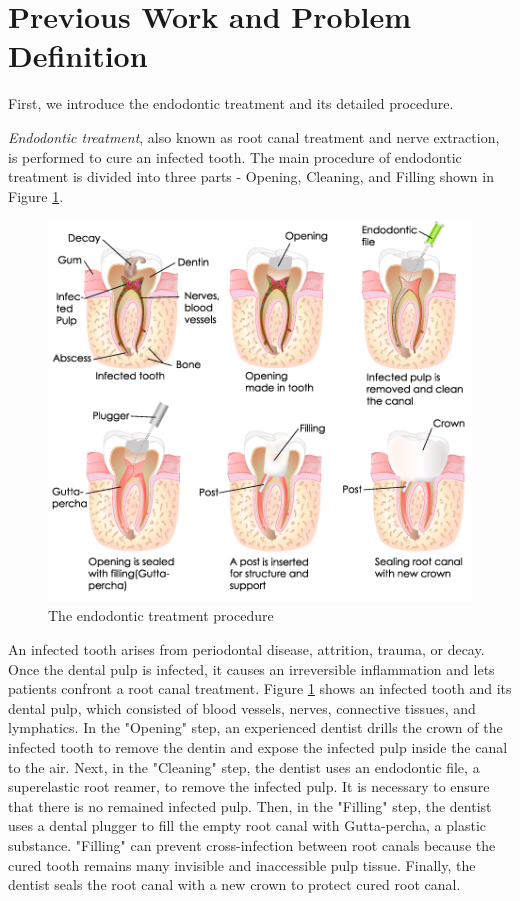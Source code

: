\section{Previous Work and Problem Definition}
\hspace*{6mm}First, we introduce the endodontic treatment and its detailed procedure.
\par
\textit{Endodontic treatment}, also known as root canal treatment and nerve extraction, is performed to cure an infected tooth. The main procedure of endodontic treatment is divided into three parts - Opening, Cleaning, and Filling shown in  Figure \ref{fig:endo-procedure}.
\begin{figure}[htbp]
\begin{center}
\includegraphics[width=0.75\linewidth]{Images/endo-procedure.png}
\caption[The endodontic treatment procedure]{The endodontic treatment procedure \cite{web7}}
\label{fig:endo-procedure}
\end{center}
\end{figure}
\par
An infected tooth arises from periodontal disease, attrition, trauma, or decay. Once the dental pulp is infected, it causes an irreversible inflammation and lets patients confront a root canal treatment. Figure \ref{fig:endo-procedure} shows an infected tooth and its dental pulp, which consisted of blood vessels, nerves, connective tissues, and lymphatics. In the "Opening" step, an experienced dentist drills the crown of the infected tooth to remove the dentin and expose the infected pulp inside the canal to the air. Next, in the "Cleaning" step, the dentist uses an endodontic file, a superelastic root reamer, to remove the infected pulp. It is necessary to ensure that there is no remained infected pulp. Then, in the "Filling" step, the dentist uses a dental plugger to fill the empty root canal with Gutta-percha, a plastic substance. "Filling" can prevent cross-infection between root canals because the cured tooth remains many invisible and inaccessible pulp tissue. Finally, the dentist seals the root canal with a new crown to protect cured root canal. 
